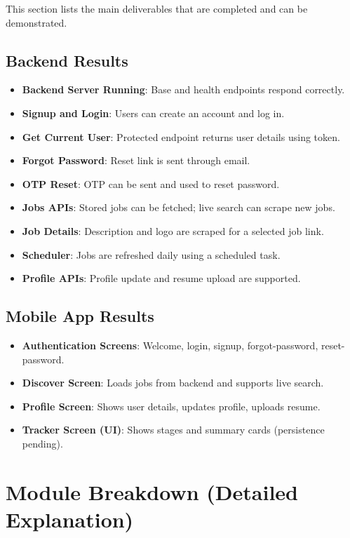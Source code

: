 \documentclass[12pt,a4paper]{report}
\begin{document}
\noindent
This section lists the main deliverables that are completed and can be demonstrated.

\subsection*{Backend Results}
\begin{itemize}[leftmargin=*, itemsep=4pt]
  \item \textbf{Backend Server Running}: Base and health endpoints respond correctly.
  \item \textbf{Signup and Login}: Users can create an account and log in.
  \item \textbf{Get Current User}: Protected endpoint returns user details using token.
  \item \textbf{Forgot Password}: Reset link is sent through email.
  \item \textbf{OTP Reset}: OTP can be sent and used to reset password.
  \item \textbf{Jobs APIs}: Stored jobs can be fetched; live search can scrape new jobs.
  \item \textbf{Job Details}: Description and logo are scraped for a selected job link.
  \item \textbf{Scheduler}: Jobs are refreshed daily using a scheduled task.
  \item \textbf{Profile APIs}: Profile update and resume upload are supported.
\end{itemize}

\subsection*{Mobile App Results}
\begin{itemize}[leftmargin=*, itemsep=4pt]
  \item \textbf{Authentication Screens}: Welcome, login, signup, forgot-password, reset-password.
  \item \textbf{Discover Screen}: Loads jobs from backend and supports live search.
  \item \textbf{Profile Screen}: Shows user details, updates profile, uploads resume.
  \item \textbf{Tracker Screen (UI)}: Shows stages and summary cards (persistence pending).
\end{itemize}

\section*{Module Breakdown (Detailed Explanation)}
\end{document}
